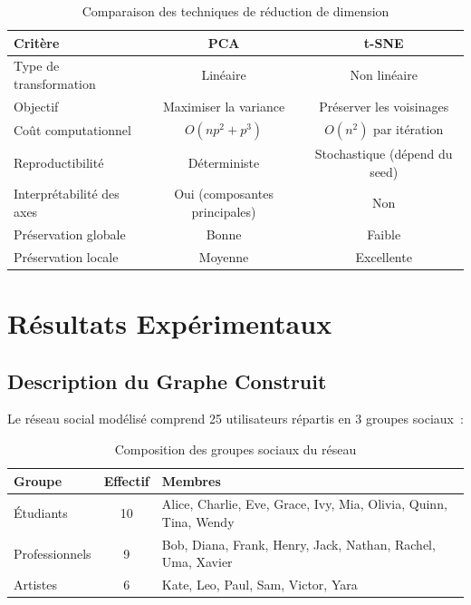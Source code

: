 \documentclass[12pt,a4paper]{article}
\begin{document}
\begin{table}[H]
\centering
\begin{tabular}{lcc}
\toprule
\textbf{Critère} & \textbf{PCA} & \textbf{t-SNE} \\
\midrule
Type de transformation & Linéaire & Non linéaire \\
Objectif & Maximiser la variance & Préserver les voisinages \\
Coût computationnel & $O(np^2 + p^3)$ & $O(n^2)$ par itération \\
Reproductibilité & Déterministe & Stochastique (dépend du seed) \\
Interprétabilité des axes & Oui (composantes principales) & Non \\
Préservation globale & Bonne & Faible \\
Préservation locale & Moyenne & Excellente \\
\bottomrule
\end{tabular}
\caption{Comparaison des techniques de réduction de dimension}
\end{table}

\section{Résultats Expérimentaux}
\label{sec:resultats}

\subsection{Description du Graphe Construit}

Le réseau social modélisé comprend 25 utilisateurs répartis en 3 groupes sociaux~:

\begin{table}[H]
\centering
\begin{tabular}{lcp{9cm}}
\toprule
\textbf{Groupe} & \textbf{Effectif} & \textbf{Membres} \\
\midrule
Étudiants & 10 & Alice, Charlie, Eve, Grace, Ivy, Mia, Olivia, Quinn, Tina, Wendy \\
Professionnels & 9 & Bob, Diana, Frank, Henry, Jack, Nathan, Rachel, Uma, Xavier \\
Artistes & 6 & Kate, Leo, Paul, Sam, Victor, Yara \\
\bottomrule
\end{tabular}
\caption{Composition des groupes sociaux du réseau}
\end{table}
\end{document}
